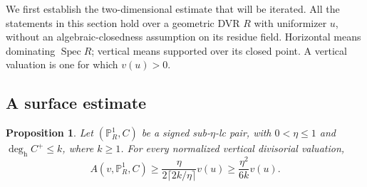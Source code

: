 \documentclass[11pt,reqno]{amsart}
\numberwithin{equation}{section}
\newtheorem{proposition}[theorem]{Proposition}
\theoremstyle{definition}
\theoremstyle{remark}
\newcommand{\PP}{\mathbb P}
\newcommand{\Spec}{\operatorname{Spec}}
\newcommand{\degh}{\deg_{\mathrm h}}
\begin{document}
We first establish the two-dimensional estimate that will be iterated. All the statements in this section hold over a geometric DVR $R$ with uniformizer $u$, without an algebraic-closedness assumption on its residue field. Horizontal means dominating $\Spec R$; vertical means supported over its closed point. A vertical valuation is one for which $v(u)>0$.

\subsection{A surface estimate}
\begin{proposition}\label{prop:surface}
Let $(\PP^1_R,C)$ be a signed sub-$\eta$-lc pair, with $0<\eta\le1$ and $\degh C^+\le k$, where $k\ge1$. For every normalized vertical divisorial valuation,
\begin{equation}\label{eq:surface}
 A(v,\PP^1_R,C)\ge
 \frac{\eta}{2\lceil2k/\eta\rceil}v(u)
 \ge\frac{\eta^2}{6k}v(u).
\end{equation}
\end{proposition}
\end{document}
